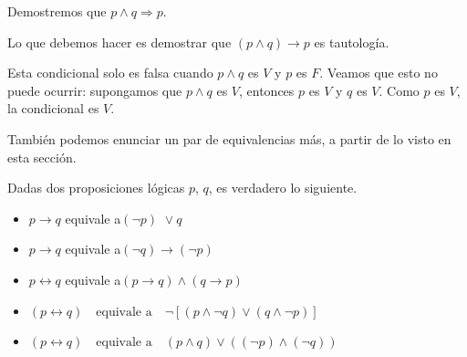 \medskip

\begin{ejemplo}
	Demostremos que $p\wedge q \Rightarrow p$.
	
	Lo que debemos hacer es demostrar que 
	$(p \wedge q)\rightarrow p$ es tautolog\'ia.
	
	Esta condicional solo es falsa cuando $p\wedge q$ es $V$ y $p$ es $F$.
	Veamos que esto no puede ocurrir: 
	supongamos que $p \wedge q$ es $V$, entonces $p$ es $V$ y $q$
	es $V$. Como $p$ es $V$, la condicional es $V$. 	
\end{ejemplo}

\medskip

También podemos enunciar un par de equivalencias más, a partir de lo visto en esta sección.

\medskip

\begin{prop}
Dadas dos proposiciones lógicas $p$, $q$, es verdadero lo siguiente.

\begin{itemize}
	\item $p \rightarrow q$ \quad\textrm{equivale a}\quad $(
\neg p)\,\, \lor q$
	\item $p \rightarrow q$ \quad\textrm{equivale a}\quad $(
\neg q) \rightarrow (
\neg p)$
	\item $p \leftrightarrow q$ \quad \textrm{equivale a}\quad $(p \rightarrow q) \wedge (q \rightarrow p)$
	\item $(p\leftrightarrow q) \quad \textrm{equivale a}\quad	
\neg[(p \wedge 
\neg q)\vee (q \wedge 
\neg p)]$
	\item $(p\leftrightarrow q) \quad \textrm{equivale a}\quad	(p\wedge q)\vee((
\neg p)\wedge(
\neg q))$
\end{itemize}
\end{prop}


\medskip


